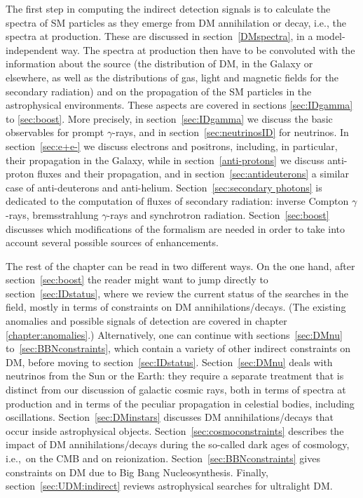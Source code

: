 The first step in computing the indirect detection signals is to calculate the spectra of SM particles as they emerge from DM annihilation or decay, i.e., the spectra at production. These are discussed in section~\ref{DMspectra}, in a model-independent way. 
The spectra at production then have to be convoluted with the information about the source (the  distribution of DM, in the Galaxy or elsewhere, as well as the distributions of gas, light and magnetic fields for the secondary radiation) and on the propagation of the SM particles in the astrophysical environments. These aspects are covered in sections \ref{sec:IDgamma} to \ref{sec:boost}. 
More precisely, in section~\ref{sec:IDgamma} we discuss the basic observables for prompt $\gamma$-rays, and in section~\ref{sec:neutrinosID} for neutrinos. 
In section~\ref{sec:e+e-} we discuss electrons and positrons, including, in particular, their propagation in the Galaxy, while in section~\ref{anti-protons} we discuss anti-proton fluxes and their propagation, and in section~\ref{sec:antideuterons} a similar case of anti-deuterons and anti-helium.
Section~\ref{sec:secondary photons} is dedicated to the computation of fluxes of secondary radiation: inverse Compton $\gamma$-rays, bremsstrahlung $\gamma$-rays and synchrotron radiation. 
Section~\ref{sec:boost} discusses which modifications of the formalism are needed in order to take into account several possible sources of enhancements.


The rest of the chapter can be read in two different ways. On the one hand, after section~\ref{sec:boost} the reader might want to jump directly to section~\ref{sec:IDstatus}, 
where we review the current status of the searches in the field, mostly in terms of constraints on DM annihilations/decays. 
(The existing anomalies and possible signals of detection are  covered in chapter \ref{chapter:anomalies}.) Alternatively, one can continue with sections~\ref{sec:DMnu} to~\ref{sec:BBNconstraints}, which contain a variety of other indirect constraints on DM, before moving to section~\ref{sec:IDstatus}. 
Section~\ref{sec:DMnu} deals with neutrinos from the Sun or the Earth: they require a separate treatment that is distinct from our discussion of galactic cosmic rays, both in terms of spectra at production and in terms of the peculiar propagation in celestial bodies, including oscillations. Section~\ref{sec:DMinstars} discusses DM annihilations/decays that occur inside astrophysical objects.
Section~\ref{sec:cosmoconstraints} describes the impact of
DM annihilations/decays during the so-called dark ages of cosmology, i.e.,~on the CMB and on reionization.
Section~\ref{sec:BBNconstraints} gives constraints on DM due to Big Bang Nucleosynthesis.
Finally, section~\ref{sec:UDM:indirect} reviews astrophysical searches for ultralight DM. 


